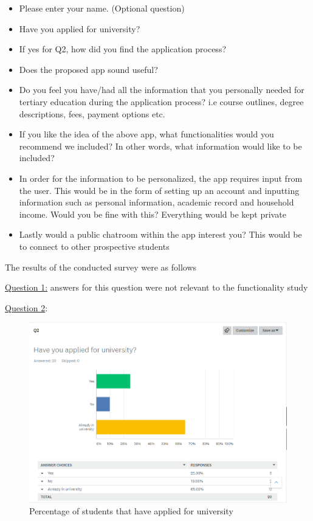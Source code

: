 \documentclass[a4paper, 12pt]{article}
\begin{document}
\begin{itemize}
\item Please enter your name. (Optional question)
\item Have you applied for university? 
\item If yes for Q2, how did you find the application process?
\item Does the proposed app sound useful?
\item Do you feel you have/had all the information that you personally needed for tertiary education during the application process? i.e course outlines, degree descriptions, fees, payment options etc.
\item If you like the idea of the above app, what functionalities would you recommend we included? In other words, what information would like to be included?
\item In order for the information to be personalized, the app requires input from the user. This would be in the form of setting up an account and inputting information such as personal information, academic record and household income. Would you be fine with this? Everything would be kept private
\item Lastly would a public chatroom within the app interest you? This would be to connect to other prospective students
\end{itemize}

\newpage
The results of the conducted survey were as follows 

\underline{Question 1:} answers for this question were not relevant to the functionality study 

\underline{Question 2}: 
\begin{figure}[h]
\centering
\includegraphics[scale=0.6]{Q2}
\caption{Percentage of students that have applied for university}
\label{fig: 1}
\end{figure}
\end{document}
